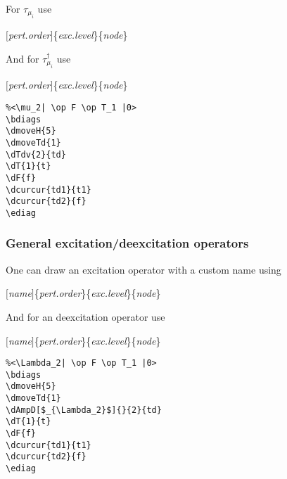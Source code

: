 \documentclass[a4paper]{article}
\newcommand{\myind}{\hspace{10pt}}
\begin{document}
For $\tau_{\mu_i}$ use

\myind{\bf \textbackslash dTv}$[${\it pert.order}$]$\{{\it exc.level}\}\{{\it node}\}

And for $\tau^{\dagger}_{\mu_i}$ use

\myind{\bf \textbackslash dTdv}$[${\it pert.order}$]$\{{\it exc.level}\}\{{\it node}\}

 \begin{minipage}[b]{0.5\linewidth}\centering
  \begin{lstlisting}
%<\mu_2| \op F \op T_1 |0>
\bdiags
\dmoveH{5}
\dmoveTd{1}
\dTdv{2}{td}
\dT{1}{t}
\dF{f}
\dcurcur{td1}{t1}
\dcurcur{td2}{f}
\ediag
  \end{lstlisting}
 \end{minipage}
 \begin{minipage}[b]{0.5\linewidth}\centering
\bdiags
{}
\ediag
 \end{minipage}

\subsubsection{General excitation/deexcitation operators}

One can draw an excitation operator with a custom name using

\myind{\bf \textbackslash dAmp}$[${\it name}$]$\{{\it pert.order}\}\{{\it exc.level}\}\{{\it node}\}

And for an deexcitation operator use 

\myind{\bf \textbackslash dAmpD}$[${\it name}$]$\{{\it pert.order}\}\{{\it exc.level}\}\{{\it node}\}

 \begin{minipage}[b]{0.5\linewidth}\centering
  \begin{lstlisting}
%<\Lambda_2| \op F \op T_1 |0>
\bdiags
\dmoveH{5}
\dmoveTd{1}
\dAmpD[$_{\Lambda_2}$]{}{2}{td}
\dT{1}{t}
\dF{f}
\dcurcur{td1}{t1}
\dcurcur{td2}{f}
\ediag
  \end{lstlisting}
 \end{minipage}
 \begin{minipage}[b]{0.5\linewidth}\centering
\bdiags
{}
\ediag
 \end{minipage}
\end{document}

